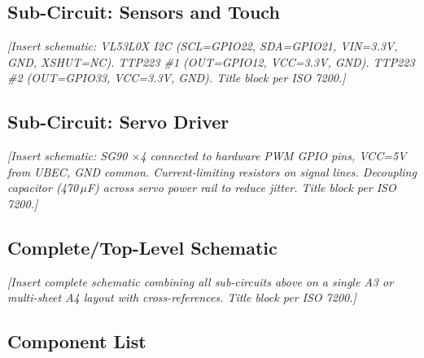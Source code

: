 \documentclass[12pt,a4paper]{article}
\begin{document}
\subsection{Sub-Circuit: Sensors and Touch}

\begin{center}
\textit{[Insert schematic: VL53L0X I2C (SCL=GPIO22, SDA=GPIO21,
VIN=3.3V, GND, XSHUT=NC). TTP223 \#1 (OUT=GPIO12, VCC=3.3V, GND).
TTP223 \#2 (OUT=GPIO33, VCC=3.3V, GND). Title block per ISO 7200.]}
\end{center}
\label{fig:ckt_sensors}

\subsection{Sub-Circuit: Servo Driver}

\begin{center}
\textit{[Insert schematic: SG90 $\times$4 connected to hardware PWM
GPIO pins, VCC=5V from UBEC, GND common. Current-limiting resistors
on signal lines. Decoupling capacitor (470\,$\mu$F) across servo
power rail to reduce jitter. Title block per ISO 7200.]}
\end{center}
\label{fig:ckt_servo}

\subsection{Complete/Top-Level Schematic}

\begin{center}
\textit{[Insert complete schematic combining all sub-circuits above
on a single A3 or multi-sheet A4 layout with cross-references.
Title block per ISO 7200.]}
\end{center}
\label{fig:ckt_complete}

\subsection{Component List}
\end{document}
